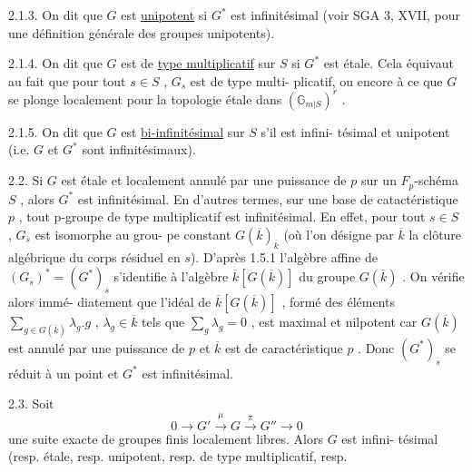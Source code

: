 
2.1.3. \quad On dit que $G$ est \uline{unipotent} si $G^*$ est infinitésimal (voir
SGA 3, XVII, pour une définition générale des groupes unipotents).

2.1.4. \quad On dit que $G$ est de \uline{type multiplicatif} sur $S$ si $G^*$ est
étale. Cela équivaut au fait que pour tout $s \in S$ , $G_s$ est de type multi-%
plicatif, ou encore à ce que $G$ se plonge localement pour la topologie
étale dans $(\mathbb{G}_{m|S})^r$ .

 2.1.5. \quad On dit que $G$ est \uline{bi-infinitésimal} sur $S$ s'il est infini-%
tésimal et unipotent (i.e. $G$ et $G^*$ sont infinitésimaux).

2.2. \quad Si $G$ est étale et localement annulé par une puissance de $p$
sur un $F_p$-schéma $S$ , alors $G^*$ est infinitésimal. En d'autres termes,
sur une base de catactéristique $p$ , tout p-groupe de type multiplicatif
est infinitésimal. En effet, pour tout $s \in S$ , $G_{\overline{s}}$ est isomorphe au grou-%
pe constant $G(\overline{k})_{\overline{k}}$ (où l'on désigne par $\overline{k}$ la clôture algébrique du
corps résiduel en $s$). D'après 1.5.1 l'algèbre affine de $(G_{\overline{s}})^* = (G^*)_{\overline{s}}$
s'identifie à l'algèbre $\overline{k}[G(\overline{k})]$ du groupe $G(\overline{k})$ . On vérifie alors immé-%
diatement que l'idéal de $\overline{k}[G(\overline{k})]$ , formé des éléments $\sum\limits_{g\in G(\overline{k})} \lambda_g.g$ , $\lambda_g \in \overline{k}$
tels que $\sum\limits_{g} \lambda_g = 0$ , est maximal et nilpotent car $G(\overline{k})$ est annulé par une
puissance de $p$ et $\overline{k}$ est de caractéristique $p$ . Donc $(G^*)_{\overline{s}}$ se réduit
à un point et $G^*$ est infinitésimal.

2.3. \quad Soit
\[
0 \to G' \overset{\mu}{\to} G \overset{\pi}{\to} G'' \to 0
\]
une suite exacte de groupes finis localement libres. Alors $G$ est infini-%
tésimal (resp. étale, resp. unipotent, resp. de type multiplicatif, resp.

